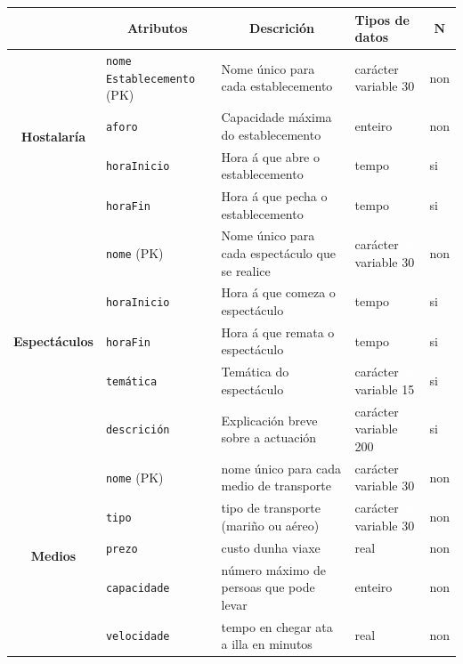 \documentclass[12pt,a4paper]{book}
\theoremstyle{definition}
\theoremstyle{break}
\begin{document}
	\newpage
	
	
	\begin{table} [H] \centering
		\begin{tabular}{|c|m{3cm}|m{4cm}|m{2cm}|m{0.7cm}|}
			\hline \rowcolor{gris}
			\multicolumn{1}{|m{2.5cm}|}{Entidade ou relación} & \multicolumn{1}{c|}{Atributos} & \multicolumn{1}{c|}{Descrición} & \multicolumn{1}{m{2cm}|}{Tipos de datos} & \multicolumn{1}{c|}{$\mathbf{N}$} \\
			\hline
			\multirow{4}{*}{\textbf{Hostalaría}} & \texttt{nome Establecemento} (PK) & Nome único para cada establecemento &  carácter \textcolor{white}{aa} variable 30 & non \\
			\cline{2-5}
			& \texttt{aforo} & Capacidade máxima do establecemento & enteiro & non \\
			\cline{2-5}
			& \texttt{horaInicio} & Hora á que abre o establecemento & tempo & si \\
			\cline{2-5}
			& \texttt{horaFin} & Hora á que pecha o establecemento & tempo & si \\
			\hline
			\multirow{5}{*}{\textbf{Espectáculos}} & \texttt{nome} (PK) & Nome único para cada espectáculo que se realice &  carácter \textcolor{white}{aa} variable 30 & non \\
			\cline{2-5}
			& \texttt{horaInicio} & Hora á que comeza o espectáculo & tempo & si \\
			\cline{2-5}
			& \texttt{horaFin} & Hora á que remata o espectáculo & tempo & si \\
			\cline{2-5}
			& \texttt{temática} & Temática do espectáculo &  carácter \textcolor{white}{aa} variable 15 & si \\
			\cline{2-5}
			& \texttt{descrición} & Explicación breve sobre a actuación &  carácter \textcolor{white}{aa} variable 200 & si \\
			\hline
			\multirow{5}{*}{\textbf{Medios}} & \texttt{nome} (PK) & nome único para cada medio de transporte &  carácter \textcolor{white}{aa} variable 30 & non\\
			\cline{2-5}
			& \texttt{tipo} & tipo de transporte (mariño ou aéreo) &  carácter \textcolor{white}{aa} variable 30 & non\\
			\cline{2-5}
			&\texttt{prezo} & custo dunha viaxe & real & non\\
			\cline{2-5}
			&\texttt{capacidade} & número máximo de persoas que pode levar & enteiro & non\\
			\cline{2-5}
			&\texttt{velocidade} & tempo en chegar ata a illa en minutos & real & non\\
			\hline
		\end{tabular}
	\end{table}
	
\end{document}
